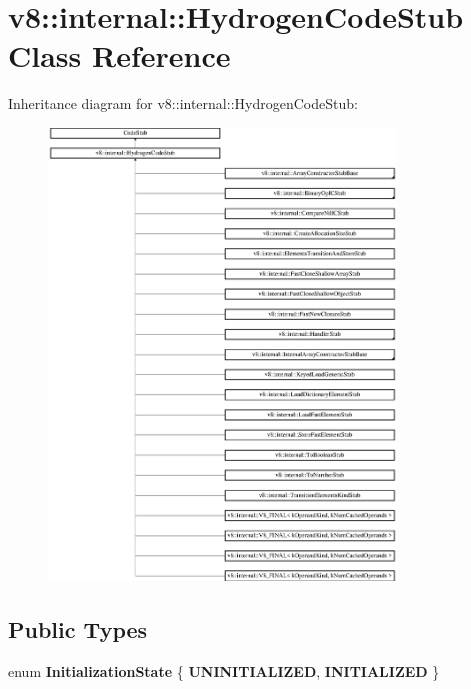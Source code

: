 \hypertarget{classv8_1_1internal_1_1_hydrogen_code_stub}{}\section{v8\+:\+:internal\+:\+:Hydrogen\+Code\+Stub Class Reference}
\label{classv8_1_1internal_1_1_hydrogen_code_stub}
Inheritance diagram for v8\+:\+:internal\+:\+:Hydrogen\+Code\+Stub\+:\begin{figure}[H]
\begin{center}
\leavevmode
\includegraphics[height=12.000000cm]{classv8_1_1internal_1_1_hydrogen_code_stub}
\end{center}
\end{figure}
\subsection*{Public Types}
\begin{DoxyCompactItemize}
\item 
\hypertarget{classv8_1_1internal_1_1_hydrogen_code_stub_a50c53ec58ef10a4a385cdce34301550b}{}enum {\bfseries Initialization\+State} \{ {\bfseries U\+N\+I\+N\+I\+T\+I\+A\+L\+I\+Z\+E\+D}, 
{\bfseries I\+N\+I\+T\+I\+A\+L\+I\+Z\+E\+D}
 \}\label{classv8_1_1internal_1_1_hydrogen_code_stub_a50c53ec58ef10a4a385cdce34301550b}

\end{DoxyCompactItemize}
